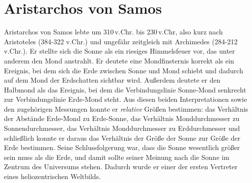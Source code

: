\section{Aristarchos von Samos}
\label{sec_Aristarchos}

Aristarchos von Samos 
lebte um 310\,v.Chr. bis 230\,v.Chr, also kurz nach Aristoteles (384-322 v.Chr.)
und ungef\"ahr zeitgleich mit Archimedes (284-212\,v.Chr.). Er stellte sich die Sonne als ein riesiges
Himmelsfeuer vor, das unter anderem den Mond anstrahlt. Er deutete eine Mondfinsternis
korrekt als ein Ereignis, bei dem sich die Erde zwischen Sonne und Mond schiebt und dadurch
auf dem Mond der Erdschatten sichtbar wird. Au\ss erdem deutete er den Halbmond als das Ereignis,
bei dem die Verbindungslinie Sonne-Mond senkrecht zur Verbindungslinie Erde-Mond steht. Aus diesen
beiden Interpretationen sowie den zugeh\"origen Messungen konnte er \textit{relative} Gr\"o\ss en
bestimmen: das Verh\"altnis der Abst\"ande Erde-Mond zu Erde-Sonne, das Verh\"altnis Monddurchmesser zu
Sonnendurchmesser, das Verh\"altnis Monddurchmesser zu Erddurchmesser und schlie\ss lich
konnte er daraus das Verh\"altnis der Gr\"o\ss e der Sonne zur Gr\"o\ss e der Erde bestimmen. Seine
Schlussfolgerung war, dass die Sonne wesentlich gr\"o\ss er sein muss als die Erde, und damit sollte
seiner Meinung nach die Sonne im Zentrum des Universums stehen. Dadurch wurde er einer der ersten
Vertreter eines heliozentrischen Weltbilds.

